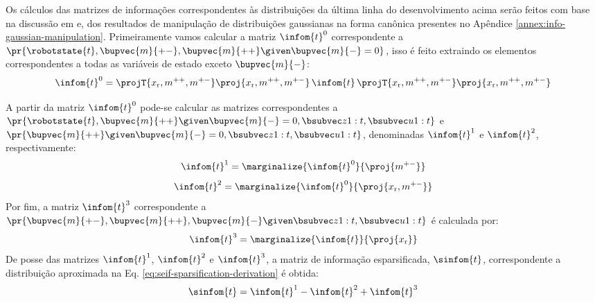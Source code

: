 Os cálculos das matrizes de informações correspondentes às distribuições da última linha do desenvolvimento acima serão feitos com base na discussão em \cite[p.~401]{bongard2006probabilistic} e, dos resultados de manipulação de distribuições gaussianas na forma canônica presentes no Apêndice \ref{annex:info-gaussian-manipulation}. 
Primeiramente vamos calcular a matriz $\infom{t}^{0}$ correspondente 
a $\pr{\robotstate{t}, \bupvec{m}{+-}, \bupvec{m}{++} \given \bupvec{m}{-} = 0}$, isso é feito extraindo os elementos correspondentes a 
todas as variáveis de estado exceto $\bupvec{m}{-}$:
\newcommand{\OmegaZeroValue}{\projT{x_\mathrm{r}, m^{++}, m^{+-}} \proj{x_\mathrm{r}, m^{++}, m^{+-}} \, \infom{t} \, \projT{x_\mathrm{r}, m^{++}, m^{+-}} \proj{x_\mathrm{r}, m^{++}, m^{+-}}}
\begin{equation}
  \infom{t}^0 = \OmegaZeroValue
  \label{eq:seif-omega-zero}
\end{equation}

A partir da matriz $\infom{t}^0$ pode-se calcular as matrizes 
correspondentes a\\
$\pr{\robotstate{t},\bupvec{m}{++}  \given \bupvec{m}{-}=0, \slamvars}$ e $\pr{\bupvec{m}{++}  \given \bupvec{m}{-}=0, \slamvars}$, denominadas $\infom{t}^1$ e $\infom{t}^2$, 
respectivamente:
\newcommand{\OmegaOneValue}{\marginalize{\infom{t}^0}{\proj{m^{+-}}}}
\begin{equation}
  \infom{t}^1 = \OmegaOneValue
\end{equation}
\newcommand{\OmegaTwoValue}{\marginalize{\infom{t}^0}{\proj{x_\mathrm{r}, m^{+-}}}}
\begin{equation}
  \infom{t}^2 = \OmegaTwoValue
\end{equation}
Por fim, a matriz $\infom{t}^3$ correspondente a $\pr{\bupvec{m}{+-}, \bupvec{m}{++}, \bupvec{m}{-} \given \slamvars}$ é calculada por:
\newcommand{\OmegaThreeValue}{\marginalize{\infom{t}}{\proj{x_\mathrm{r}}}}
\begin{equation}
  \infom{t}^3 = \OmegaThreeValue
\end{equation}
De posse das matrizes $\infom{t}^1$, $\infom{t}^2$ e $\infom{t}^3$, a 
matriz de informação esparsificada, $\sinfom{t}$, correspondente a distribuição 
aproximada na Eq. \ref{eq:seif-sparsification-derivation} é obtida:
\begin{equation}
  \sinfom{t} = \infom{t}^1 - \infom{t}^2 + \infom{t}^3
  \label{eq:seif-sparse-infom}
\end{equation}

